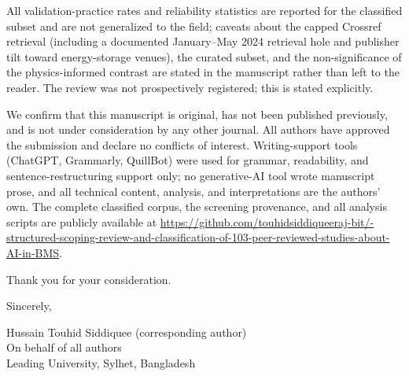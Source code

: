 \documentclass[11pt]{article}
\begin{document}
\vspace{6pt}
All validation-practice rates and reliability statistics are reported for the classified subset and are not generalized to the field; caveats about the capped Crossref retrieval (including a documented January--May 2024 retrieval hole and publisher tilt toward energy-storage venues), the curated subset, and the non-significance of the physics-informed contrast are stated in the manuscript rather than left to the reader. The review was not prospectively registered; this is stated explicitly.

\vspace{6pt}
We confirm that this manuscript is original, has not been published previously, and is not under consideration by any other journal. All authors have approved the submission and declare no conflicts of interest. Writing-support tools (ChatGPT, Grammarly, QuillBot) were used for grammar, readability, and sentence-restructuring support only; no generative-AI tool wrote manuscript prose, and all technical content, analysis, and interpretations are the authors' own. The complete classified corpus, the screening provenance, and all analysis scripts are publicly available at \url{https://github.com/touhidsiddiqueeraj-bit/-structured-scoping-review-and-classification-of-103-peer-reviewed-studies-about-AI-in-BMS}.

\vspace{6pt}
Thank you for your consideration.

\vspace{18pt}
\noindent
Sincerely,

\vspace{24pt}
\noindent
Hussain Touhid Siddiquee (corresponding author)\\
On behalf of all authors\\
Leading University, Sylhet, Bangladesh
\end{document}

